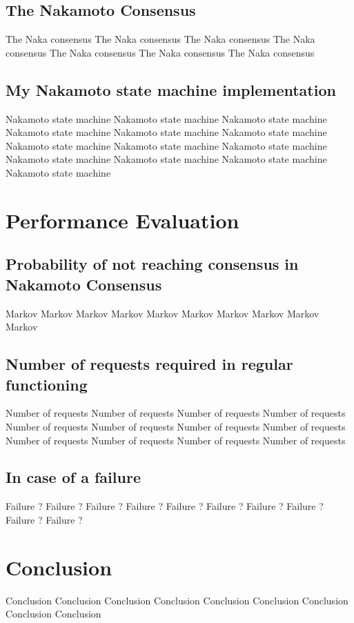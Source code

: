 \documentclass[11pt, twocolumn]{article}
\begin{document}
\subsection{The Nakamoto Consensus}

The Naka consensus
The Naka consensus
The Naka consensus
The Naka consensus
The Naka consensus
The Naka consensus
The Naka consensus

\subsection{My Nakamoto state machine implementation}

Nakamoto state machine
Nakamoto state machine
Nakamoto state machine
Nakamoto state machine
Nakamoto state machine
Nakamoto state machine
Nakamoto state machine
Nakamoto state machine
Nakamoto state machine
Nakamoto state machine
Nakamoto state machine
Nakamoto state machine
Nakamoto state machine

\section{Performance Evaluation}
\subsection{Probability of not reaching consensus in Nakamoto Consensus}

Markov
Markov
Markov
Markov
Markov
Markov
Markov
Markov
Markov
Markov

\subsection{Number of requests required in regular functioning}

Number of requests
Number of requests
Number of requests
Number of requests
Number of requests
Number of requests
Number of requests
Number of requests
Number of requests
Number of requests
Number of requests
Number of requests

\subsection{In case of a failure}

Failure ?
Failure ?
Failure ?
Failure ?
Failure ?
Failure ?
Failure ?
Failure ?
Failure ?
Failure ?

\section{Conclusion}

Conclusion
Conclusion
Conclusion
Conclusion
Conclusion
Conclusion
Conclusion
Conclusion
Conclusion



\end{document}
